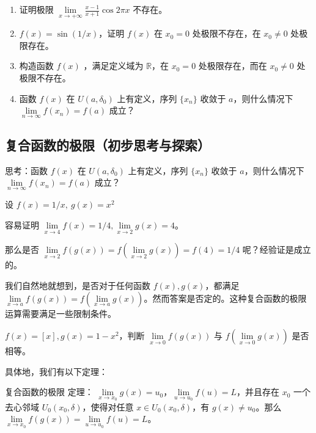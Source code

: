 \begin{exercise}{}
\begin{enumerate}
\item 证明极限 $\lim\limits_{x\rightarrow +\infty} \frac{x-1}{x+1}\cos 2\pi x$ 不存在。

\item $f(x)=\sin(1/x)$，证明 $f(x)$ 在 $x_0=0$ 处极限不存在，在 $x_0\neq 0$ 处极限存在。

\item 构造函数 $f(x)$ ，满足定义域为 $\mathbb{R}$，在 $x_0=0$ 处极限存在，而在  $x_0\neq 0$ 处极限不存在。

\item 函数 $f(x)$ 在 $U(a,\delta_0)$ 上有定义，序列 $\{x_n\}$ 收敛于 $a$，则什么情况下 $\lim\limits_{n\rightarrow \infty}f(x_n)=f(a)$ 成立？
\end{enumerate}
\end{exercise}


\subsection{复合函数的极限（初步思考与探索）}
\begin{exercise}{}
思考：函数 $f(x)$ 在 $U(a,\delta_0)$ 上有定义，序列 $\{x_n\}$ 收敛于 $a$，则什么情况下 $\lim\limits_{n\rightarrow \infty}f(x_n)=f(a)$ 成立？
\end{exercise}
设 $f(x)=1/x,\ g(x)=x^2$

  容易证明 $\lim\limits_{x\rightarrow 4}f(x)=1/4,\lim\limits_{x\rightarrow 2}g(x)=4$。

  那么是否 $\lim\limits_{x\rightarrow 2}f(g(x))=f(\lim\limits_{x\rightarrow 2}g(x))=f(4)=1/4$ 呢？经验证是成立的。

  我们自然地就想到，是否对于任何函数 $f(x),g(x)$，都满足 $\lim\limits_{x\rightarrow a}f(g(x))=f(\lim\limits_{x\rightarrow a}g(x))$。然而答案是否定的。这种复合函数的极限运算需要满足一些限制条件。
\begin{exercise}{}
$f(x)=[x],g(x)=1-x^2$，判断 $\lim\limits_{x\rightarrow 0}f(g(x)) $ 与 $f(\lim\limits_{x\rightarrow 0}g(x))$ 是否相等。
\end{exercise}

具体地，我们有以下定理：
\begin{theorem}{复合函数的极限}\label{the_limff_1}
定理： $\lim\limits_{x\rightarrow x_0}g(x)=u_0$，$\lim\limits_{u\rightarrow u_0}f(u)=L$，并且存在 $x_0$ 一个去心邻域 $U_0(x_0,\delta)$，使得对任意 $x\in U_0(x_0,\delta)$，有 $g(x)\neq u_0$。那么 $\lim\limits_{x\rightarrow x_0}f(g(x))=\lim\limits_{u\rightarrow u_0}f(u)=L$。
\end{theorem}

